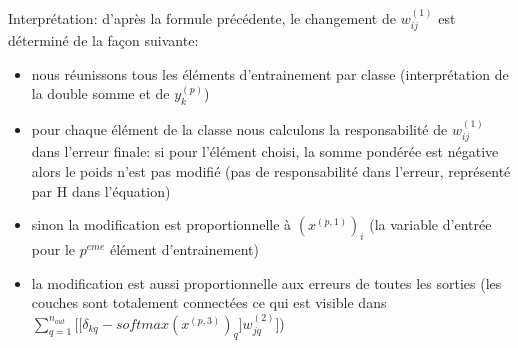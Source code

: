 \documentclass[a4paper,11pt,oneside,roman]{article}
\begin{document}
    Interprétation:
    d'après la formule précédente, le changement de $w_{ij}^{(1)}$ est déterminé de la façon suivante:
    \begin{itemize}
        \item nous réunissons tous les éléments d'entrainement par classe (interprétation de la double somme et de $y_k^{(p)}$)
        \item pour chaque élément de la classe nous calculons la responsabilité de $w_{ij}^{(1)}$ dans l'erreur finale: si pour l'élément choisi, la somme pondérée est négative alors le poids n'est pas modifié (pas de responsabilité dans l'erreur, représenté par H dans l'équation)
        \item sinon la modification est proportionnelle à $(x^{(p,1)})_i$ (la variable d'entrée pour le $p^{eme}$ élément d'entrainement) 
        \item la modification est aussi proportionnelle aux erreurs de toutes les sorties (les couches sont totalement connectées ce qui est visible dans $\sum\limits_{q=1}^{n_{out}} \bigg[ \big[ \delta_{kq} - softmax(x^{(p,3)})_q \big] w_{jq}^{(2)} \bigg]$)
    \end{itemize}


    
\end{document}
